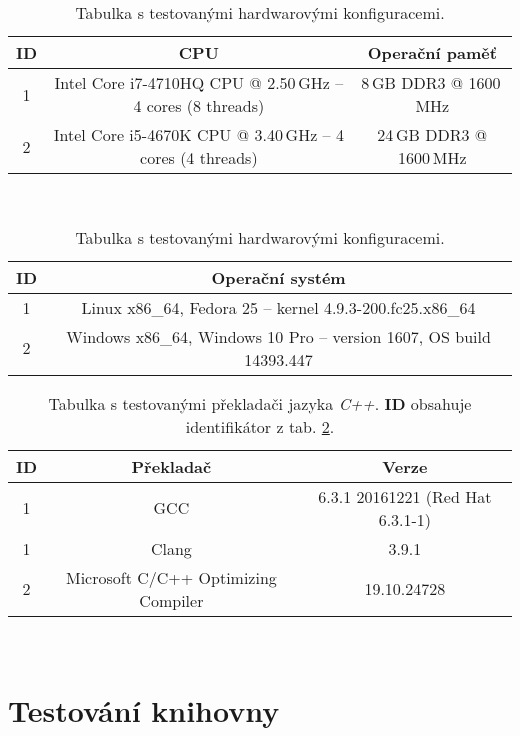 \begin{table}[H]
	\begin{center}
		\begin{tabular}{| c | c | c |}
			\hline
			\textbf{ID} & \textbf{CPU} & \textbf{Operační paměť} \\
			\hline
			1 & Intel Core i7-4710HQ CPU @ 2.50\,GHz -- 4 cores (8 threads) & 8\,GB DDR3 @ 1600\,MHz \\
			\hline
			2 & Intel Core i5-4670K CPU @ 3.40\,GHz -- 4 cores (4 threads) & 24\,GB DDR3 @ 1600\,MHz \\
			\hline
		\end{tabular}\\[1em]
		\begin{tabular}{| c | c |}
			\hline
			\textbf{ID} & \textbf{Operační systém} \\
			\hline
			1 & Linux x86\_64, Fedora 25 -- kernel 4.9.3-200.fc25.x86\_64 \\
			\hline
			2 & Windows x86\_64, Windows 10 Pro -- version 1607, OS build 14393.447 \\
			\hline
		\end{tabular}
		\caption{Tabulka s testovanými hardwarovými konfiguracemi.}
		\label{Tab:HW}
	\end{center}
\end{table}

\begin{table}[H]
	\begin{center}
		\begin{tabular}{| c | c | c |}
			\hline
			\textbf{ID} & \textbf{Překladač} & \textbf{Verze} \\
			\hline
			1 & GCC & 6.3.1 20161221 (Red Hat 6.3.1-1) \\
			\hline
			1 & Clang & 3.9.1 \\
			\hline
			2 & Microsoft C/C++ Optimizing Compiler & 19.10.24728 \\
			\hline
		\end{tabular}\\[1em]
		\caption{Tabulka s testovanými překladači jazyka \emph{C++}. \textbf{ID} obsahuje identifikátor z tab. \ref{Tab:HW}.}
		\label{Tab:Compiler}
	\end{center}
\end{table}

\section{Testování knihovny}

